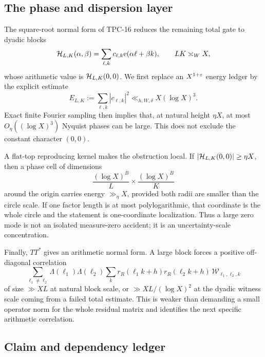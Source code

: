 \subsection{The phase and dispersion layer}

The square-root normal form of TPC-16 reduces the remaining total gate
to dyadic blocks
\begin{equation}
 \mathcal H_{L,K}(\alpha,\beta)
 =\sum_{\ell,k}c_{\ell,k}\mathrm e(\alpha\ell+\beta k),
 \qquad LK\asymp_W X,
 \label{eq:phase-block-intro}
\end{equation}
whose arithmetic value is $\mathcal H_{L,K}(0,0)$.  We first replace an
$X^{1+\varepsilon}$ energy ledger by the explicit estimate
\begin{equation}
 E_{L,K}:=\sum_{\ell,k}|c_{\ell,k}|^2
 \ll_{h,W,\delta}X(\log X)^3.
 \label{eq:explicit-energy-intro}
\end{equation}
Exact finite Fourier sampling then implies that, at natural height
$\eta X$, at most $O_\eta((\log X)^3)$ Nyquist phases can be large.
This does not exclude the constant character $(0,0)$.

A flat-top reproducing kernel makes the obstruction local.  If
$|\mathcal H_{L,K}(0,0)|\ge\eta X$, then a phase cell of dimensions
\begin{equation}
 \frac{(\log X)^B}{L}\times\frac{(\log X)^B}{K}
 \label{eq:planck-cell-intro}
\end{equation}
around the origin carries energy $\gg_\eta X$, provided both radii are
smaller than the circle scale.  If one factor length is at most
polylogarithmic, that coordinate is the whole circle and the statement
is one-coordinate localization.  Thus a large zero mode
is not an isolated measure-zero accident; it is an uncertainty-scale
concentration.

Finally, $TT^*$ gives an arithmetic normal form.  A large block forces
a positive off-diagonal correlation
\begin{equation}
 \sum_{\ell_1\ne\ell_2}\Lambda(\ell_1)\Lambda(\ell_2)
 \sum_k r_R(\ell_1k+h)r_R(\ell_2k+h)\,\mathcal W_{\ell_1,\ell_2,k}
 \label{eq:ttstar-correlation-intro}
\end{equation}
of size $\gg XL$ at natural block scale, or
$\gg XL/(\log X)^2$ at the dyadic witness scale coming from a failed
total estimate.  This is weaker than demanding a small operator norm
for the whole residual matrix and identifies the next specific
arithmetic correlation.

\subsection{Claim and dependency ledger}

